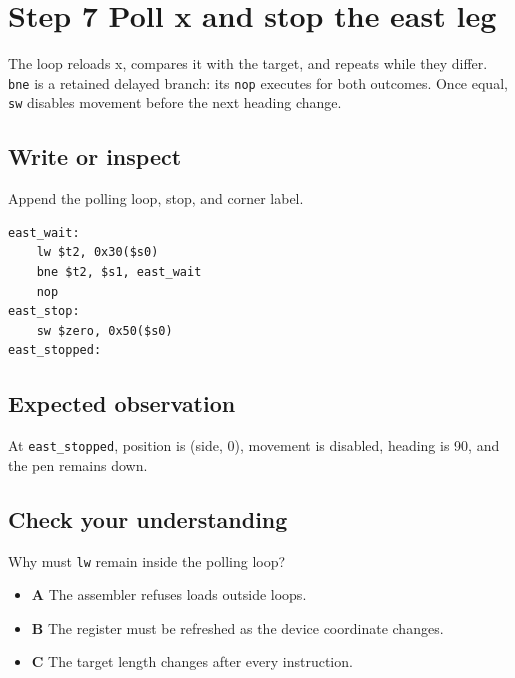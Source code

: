 \section{Step 7 Poll x and stop the east
  leg}\label{006-marsbot-square-s07-step-7-poll-x-and-stop-the-east-leg}

The loop reloads x, compares it with the target, and repeats while they
differ. \texttt{bne} is a retained delayed branch: its \texttt{nop}
executes for both outcomes. Once equal, \texttt{sw} disables movement
before the next heading change.

\subsection{Write or
  inspect}\label{006-marsbot-square-s07-write-or-inspect}

Append the polling loop, stop, and corner label.

\begin{verbatim}
east_wait:
    lw $t2, 0x30($s0)
    bne $t2, $s1, east_wait
    nop
east_stop:
    sw $zero, 0x50($s0)
east_stopped:
\end{verbatim}

\subsection{Expected
  observation}\label{006-marsbot-square-s07-expected-observation}

At \texttt{east\_stopped}, position is (side, 0), movement is disabled,
heading is 90, and the pen remains down.

\subsection{Check your
  understanding}\label{006-marsbot-square-s07-check-your-understanding}

Why must \texttt{lw} remain inside the polling loop?

\begin{itemize}
  \tightlist
  \item
        \textbf{A} The assembler refuses loads outside loops.
  \item
        \textbf{B} The register must be refreshed as the device coordinate
        changes.
  \item
        \textbf{C} The target length changes after every instruction.
\end{itemize}
